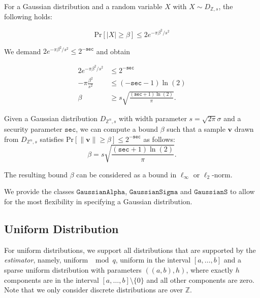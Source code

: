 For a Gaussian distribution and a random variable $X$ with $X \sim D_{\mathbb{Z}, s}$, the following holds: %

\begin{equation}
    \text{Pr}\left[ |X| \geq \beta \right] \leq 2 e^{-\pi \beta^2/s^2}
\end{equation}

We demand $2 e^{-\pi \beta^2/s^2} \leq 2^{-\texttt{sec}}$  and obtain

\begin{align*}
    2 e^{-\pi \beta^2/s^2}   & \leq 2^{-\texttt{sec}}                               \\
    -\pi \frac{\beta^2}{s^2} & \leq (-\texttt{sec} - 1)\ln (2)                      \\
    \beta                    & \geq s \sqrt{\frac{(\texttt{sec} + 1) \ln(2)}{\pi}}.
\end{align*}


\begin{theorem}
    Given a Gaussian distribution $D_{\mathbb{Z}^n, s}$ with width parameter $s  = \sqrt{2 \pi} \sigma$ and a security parameter $\texttt{sec}$, we can compute a bound $\beta$ such that a sample $\mathbf{v}$ drawn from $D_{\mathbb{Z}^n, s}$ satisfies $\text{Pr}\left[ \|\mathbf{v}\| \geq \beta \right] \leq 2^{-\texttt{sec}}$ as follows:
    \begin{equation}
        \beta  = s \sqrt{\frac{(\texttt{sec} + 1) \ln(2)}{\pi}}.
    \end{equation}
\end{theorem}

The resulting bound $\beta$ can be considered as a bound in $\ell_\infty$ or $\ell_2$-norm. %

We provide the classes $\texttt{GaussianAlpha}$, $\texttt{GaussianSigma}$ and $\texttt{GaussianS}$ to allow for the most flexibility in specifying a Gaussian distribution.

\subsection{Uniform Distribution}
For uniform distributions, we support all distributions that are supported by the \textit{estimator}, namely, uniform $\mod q$, uniform in the interval $[a,\dots,b]$ and a sparse uniform distribution with parameters $((a,b), h)$, where exactly $h$ components are in the interval $[a,\dots,b] \setminus \{0\}$ and all other components are zero. Note that we only consider discrete distributions are over $\mathbb{Z}$.

